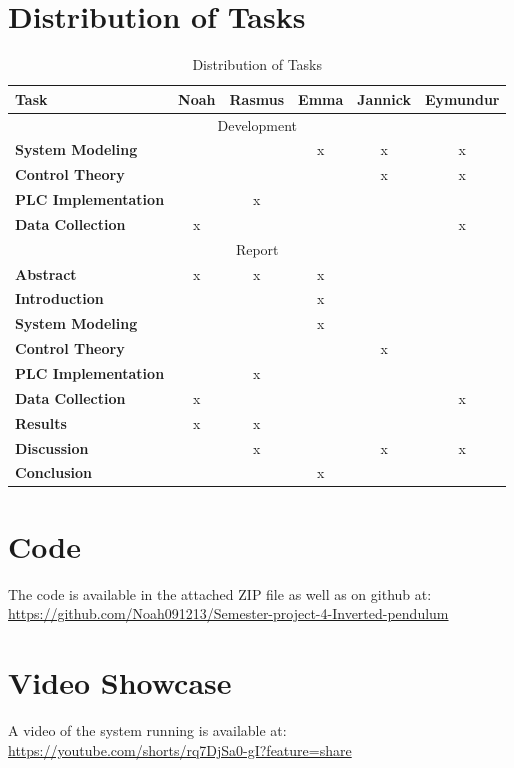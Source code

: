 \newpage
\begingroup
\renewcommand{\clearpage}{}

\chapter{Distribution of Tasks}
\label{chap:taskdistribution}

\begin{table}[h!]
	\centering
	\caption{Distribution of Tasks}
	\label{tab:dot}
	\begin{tabular}{lccccc}
		\toprule
		\textbf{Task} & \textbf{Noah} & \textbf{Rasmus} & \textbf{Emma} & \textbf{Jannick} & \textbf{Eymundur} \\
		\midrule
		\multicolumn{6}{c}{Development} \\
		\midrule
		\textbf{System Modeling} & & & x & x & x \\
		\textbf{Control Theory} & & & & x & x \\
		\textbf{PLC Implementation} & & x & & & \\
		\textbf{Data Collection} & x & & & & x \\
		\midrule
		\multicolumn{6}{c}{Report} \\
		\midrule
		\textbf{Abstract} & x & x & x & & \\
		\textbf{Introduction} & & & x & & \\
		\textbf{System Modeling} & & & x & & \\
		\textbf{Control Theory} & & & & x & \\
		\textbf{PLC Implementation} & & x & & & \\
		\textbf{Data Collection} & x & & & & x \\
		\textbf{Results} & x & x & & &\\
		\textbf{Discussion} & & x & & x & x \\
		\textbf{Conclusion} & & & x & & \\
		\bottomrule
	\end{tabular}
\end{table}

\chapter{Code}
\label{chap:code}

The code is available in the attached ZIP file as well as on github at: \\
\url{https://github.com/Noah091213/Semester-project-4-Inverted-pendulum}

\chapter{Video Showcase}
\label{chap:videoshowcase}

A video of the system running is available at: \\
\url{https://youtube.com/shorts/rq7DjSa0-gI?feature=share}

\endgroup